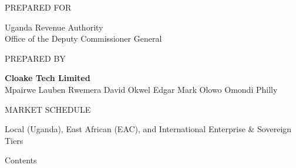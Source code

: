 \documentclass[10pt,a4paper]{article}
\begin{document}
\begin{titlepage}
\vspace{14mm}
\noindent\begin{minipage}[t]{48mm}\RaggedRight
{\fontsize{6.4}{8}\selectfont\textcolor{inkiii}{PREPARED FOR}\par}\vspace{1.6mm}
{\fontsize{8}{11}\selectfont Uganda Revenue Authority\\Office of the Deputy Commissioner General\par}
\end{minipage}\hfill
\begin{minipage}[t]{62mm}\RaggedRight
{\fontsize{6.4}{8}\selectfont\textcolor{inkiii}{PREPARED BY}\par}\vspace{1.6mm}
{\fontsize{8}{11}\selectfont \textbf{Cloake Tech Limited}\\
Mpairwe Lauben \textperiodcentered{} Rwemera David \textperiodcentered{} Okwel Edgar Mark \textperiodcentered{} Olowo Omondi Philly\par}
\end{minipage}\hfill
\begin{minipage}[t]{50mm}\RaggedRight
{\fontsize{6.4}{8}\selectfont\textcolor{inkiii}{MARKET SCHEDULE}\par}\vspace{1.6mm}
{\fontsize{8}{11}\selectfont Local (Uganda), East African (EAC), and International Enterprise \& Sovereign Tiers\par}
\end{minipage}
\restoregeometry
\end{titlepage}

\clearpage
{}
{\displayfont\fontsize{13}{15}\selectfont\textcolor{ink}{Contents}\par}
\vspace{3mm}
\begingroup
\setlength{\parskip}{0pt}
\setcounter{tocdepth}{2}
\makeatletter{}\makeatother
\makeatletter
\renewcommand{\l@section}[2]{\vspace{2.2mm}%
  \noindent{\labelfont\fontsize{8.6}{10.5}\selectfont\textcolor{ink}{#1}}%
  \hfill{\datafont\fontsize{7.6}{9}\selectfont\textcolor{slate}{#2}}\par}
\renewcommand{\l@subsection}[2]{%
  \noindent\hspace{6mm}\begin{minipage}[t]{\dimexpr\linewidth-16mm\relax}\RaggedRight
  {\fontsize{8.2}{10}\selectfont\textcolor{inkii}{#1}}\end{minipage}%
  \hfill{\datafont\fontsize{7.4}{9}\selectfont\textcolor{inkiii}{#2}}\par\vspace{0.6mm}}
\makeatother
\tableofcontents
\endgroup

\clearpage
{}

\end{document}

